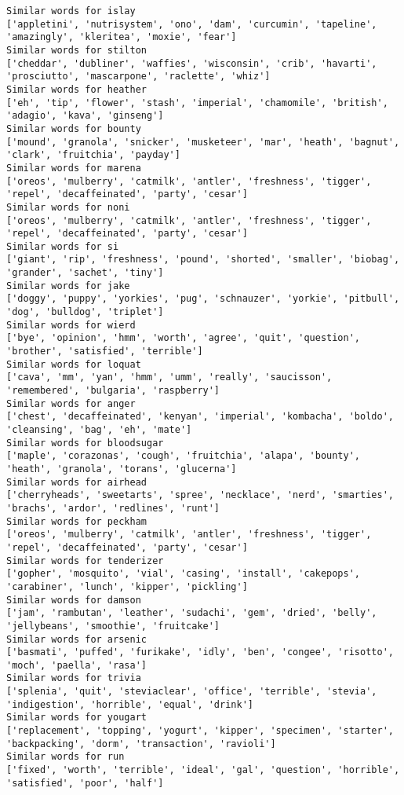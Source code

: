 \documentclass[11pt]{article}
\begin{document}
\begin{Verbatim}[commandchars=\\\{\}]
Similar words for islay
['appletini', 'nutrisystem', 'ono', 'dam', 'curcumin', 'tapeline', 'amazingly', 'kleritea', 'moxie', 'fear']
Similar words for stilton
['cheddar', 'dubliner', 'waffies', 'wisconsin', 'crib', 'havarti', 'prosciutto', 'mascarpone', 'raclette', 'whiz']
Similar words for heather
['eh', 'tip', 'flower', 'stash', 'imperial', 'chamomile', 'british', 'adagio', 'kava', 'ginseng']
Similar words for bounty
['mound', 'granola', 'snicker', 'musketeer', 'mar', 'heath', 'bagnut', 'clark', 'fruitchia', 'payday']
Similar words for marena
['oreos', 'mulberry', 'catmilk', 'antler', 'freshness', 'tigger', 'repel', 'decaffeinated', 'party', 'cesar']
Similar words for noni
['oreos', 'mulberry', 'catmilk', 'antler', 'freshness', 'tigger', 'repel', 'decaffeinated', 'party', 'cesar']
Similar words for si
['giant', 'rip', 'freshness', 'pound', 'shorted', 'smaller', 'biobag', 'grander', 'sachet', 'tiny']
Similar words for jake
['doggy', 'puppy', 'yorkies', 'pug', 'schnauzer', 'yorkie', 'pitbull', 'dog', 'bulldog', 'triplet']
Similar words for wierd
['bye', 'opinion', 'hmm', 'worth', 'agree', 'quit', 'question', 'brother', 'satisfied', 'terrible']
Similar words for loquat
['cava', 'mm', 'yan', 'hmm', 'umm', 'really', 'saucisson', 'remembered', 'bulgaria', 'raspberry']
Similar words for anger
['chest', 'decaffeinated', 'kenyan', 'imperial', 'kombacha', 'boldo', 'cleansing', 'bag', 'eh', 'mate']
Similar words for bloodsugar
['maple', 'corazonas', 'cough', 'fruitchia', 'alapa', 'bounty', 'heath', 'granola', 'torans', 'glucerna']
Similar words for airhead
['cherryheads', 'sweetarts', 'spree', 'necklace', 'nerd', 'smarties', 'brachs', 'ardor', 'redlines', 'runt']
Similar words for peckham
['oreos', 'mulberry', 'catmilk', 'antler', 'freshness', 'tigger', 'repel', 'decaffeinated', 'party', 'cesar']
Similar words for tenderizer
['gopher', 'mosquito', 'vial', 'casing', 'install', 'cakepops', 'carabiner', 'lunch', 'kipper', 'pickling']
Similar words for damson
['jam', 'rambutan', 'leather', 'sudachi', 'gem', 'dried', 'belly', 'jellybeans', 'smoothie', 'fruitcake']
Similar words for arsenic
['basmati', 'puffed', 'furikake', 'idly', 'ben', 'congee', 'risotto', 'moch', 'paella', 'rasa']
Similar words for trivia
['splenia', 'quit', 'steviaclear', 'office', 'terrible', 'stevia', 'indigestion', 'horrible', 'equal', 'drink']
Similar words for yougart
['replacement', 'topping', 'yogurt', 'kipper', 'specimen', 'starter', 'backpacking', 'dorm', 'transaction', 'ravioli']
Similar words for run
['fixed', 'worth', 'terrible', 'ideal', 'gal', 'question', 'horrible', 'satisfied', 'poor', 'half']

\end{Verbatim}
\end{document}
